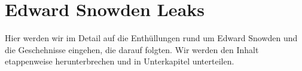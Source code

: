 \newpage
\section{Edward Snowden Leaks}
Hier werden wir im Detail auf die Enthüllungen rund um Edward Snowden und die Geschehnisse eingehen, die darauf folgten. Wir werden den Inhalt etappenweise herunterbrechen und in Unterkapitel unterteilen.
